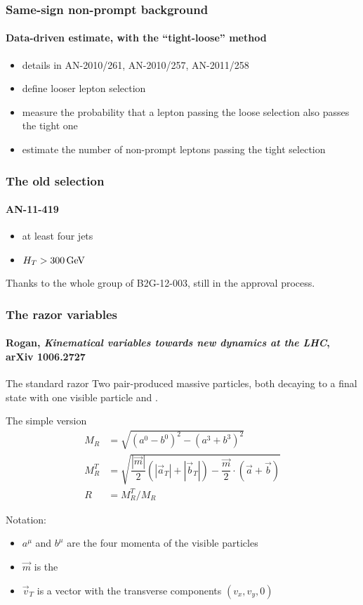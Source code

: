 \documentclass[ukenglish]{beamer}
\begin{document}
\begin{frame}
    \frametitle{Same-sign non-prompt background}
    \framesubtitle{Data-driven estimate, with the ``tight-loose'' method}
    \begin{itemize}
        \item details in AN-2010/261, AN-2010/257, AN-2011/258
        \item define looser lepton selection
        \item measure the probability that a lepton passing the loose
            selection also passes the tight one
        \item estimate the number of non-prompt leptons passing the tight
            selection
    \end{itemize}
\end{frame}

\begin{frame}
    \frametitle{The old selection}
    \framesubtitle{AN-11-419}
    \begin{itemize}
        \item at least four jets
        \item $H_T > \unit[300]{GeV}$
    \end{itemize}
    Thanks to the whole group of B2G-12-003, still in the approval process.
\end{frame}

\begin{frame}
    \frametitle{The razor variables}
    \framesubtitle{Rogan, \emph{Kinematical variables towards new dynamics
    at the LHC}, arXiv 1006.2727}
    \begin{block}{The standard razor}
        Two pair-produced massive particles, both decaying to a final state with
        one visible particle and \met.
    \end{block}
    \begin{block}
        {The simple version}
        \begin{align*}
            M_R &= \sqrt{(a^0 - b^0)^2 - (a^3 + b^3)^2} \\
            M_R^T &= \sqrt{\dfrac{|\vec{m}|}{2} (|\vec{a}_T| + |\vec{b}_T|) 
            -\dfrac{\vec{m}}{2} \cdot (\vec{a} + \vec{b})}\\
            R &= M_R^T / M_R
        \end{align*}
    \end{block}
    Notation:
    \begin{itemize}
        \item $a^\mu$ and $b^\mu$ are the four momenta of the visible
            particles
        \item $\vec{m}$ is the \met
        \item $\vec{v}_T$ is a vector with the transverse components
            $(v_x, v_y, 0)$
    \end{itemize}
\end{frame}
\end{document}
